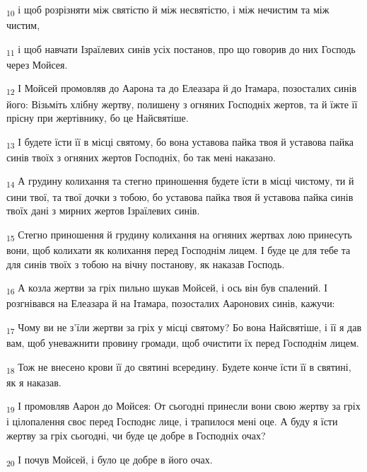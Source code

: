 \begin{tcolorbox}
\textsubscript{10} і щоб розрізняти між святістю й між несвятістю, і між нечистим та між чистим,
\end{tcolorbox}
\begin{tcolorbox}
\textsubscript{11} і щоб навчати Ізраїлевих синів усіх постанов, про що говорив до них Господь через Мойсея.
\end{tcolorbox}
\begin{tcolorbox}
\textsubscript{12} І Мойсей промовляв до Аарона та до Елеазара й до Ітамара, позосталих синів його: Візьміть хлібну жертву, полишену з огняних Господніх жертов, та й їжте її прісну при жертівнику, бо це Найсвятіше.
\end{tcolorbox}
\begin{tcolorbox}
\textsubscript{13} І будете їсти її в місці святому, бо вона уставова пайка твоя й уставова пайка синів твоїх з огняних жертов Господніх, бо так мені наказано.
\end{tcolorbox}
\begin{tcolorbox}
\textsubscript{14} А грудину колихання та стегно приношення будете їсти в місці чистому, ти й сини твої, та твої дочки з тобою, бо уставова пайка твоя й уставова пайка синів твоїх дані з мирних жертов Ізраїлевих синів.
\end{tcolorbox}
\begin{tcolorbox}
\textsubscript{15} Стегно приношення й грудину колихання на огняних жертвах лою принесуть вони, щоб колихати як колихання перед Господнім лицем. І буде це для тебе та для синів твоїх з тобою на вічну постанову, як наказав Господь.
\end{tcolorbox}
\begin{tcolorbox}
\textsubscript{16} А козла жертви за гріх пильно шукав Мойсей, і ось він був спалений. І розгнівався на Елеазара й на Ітамара, позосталих Ааронових синів, кажучи:
\end{tcolorbox}
\begin{tcolorbox}
\textsubscript{17} Чому ви не з'їли жертви за гріх у місці святому? Бо вона Найсвятіше, і її я дав вам, щоб уневажнити провину громади, щоб очистити їх перед Господнім лицем.
\end{tcolorbox}
\begin{tcolorbox}
\textsubscript{18} Тож не внесено крови її до святині всередину. Будете конче їсти її в святині, як я наказав.
\end{tcolorbox}
\begin{tcolorbox}
\textsubscript{19} І промовляв Аарон до Мойсея: От сьогодні принесли вони свою жертву за гріх і цілопалення своє перед Господнє лице, і трапилося мені оце. А буду я їсти жертву за гріх сьогодні, чи буде це добре в Господніх очах?
\end{tcolorbox}
\begin{tcolorbox}
\textsubscript{20} І почув Мойсей, і було це добре в його очах.
\end{tcolorbox}
